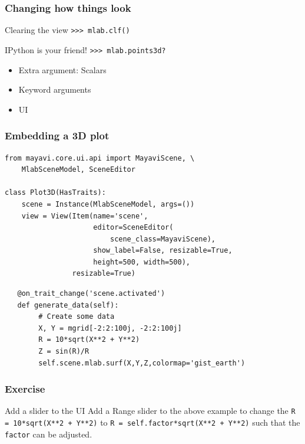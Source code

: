 \documentclass[14pt,compress]{beamer}
\newcommand{\typ}[1]{\lstinline{#1}}
\newcommand{\PythonCode}[1]{\lstinline{#1}}
\begin{document}
\begin{frame}
    \frametitle{Changing how things look}

    \begin{block}{Clearing the view}
    \typ{>>> mlab.clf()}
    \end{block}

    \pause

    \begin{block}{IPython is your friend!}
    \PythonCode{>>> mlab.points3d?}

    \begin{itemize}

        \item Extra argument: Scalars

        \item Keyword arguments

        \item UI
    \end{itemize}
    \end{block}
\end{frame}

\begin{frame}
\frametitle{Embedding a 3D plot}
\footnotesize
\begin{lstlisting}
from mayavi.core.ui.api import MayaviScene, \
    MlabSceneModel, SceneEditor

class Plot3D(HasTraits):
    scene = Instance(MlabSceneModel, args=())
    view = View(Item(name='scene',
                     editor=SceneEditor(
                         scene_class=MayaviScene),
                     show_label=False, resizable=True,
                     height=500, width=500),
                resizable=True)
\end{lstlisting}
\pause
\begin{lstlisting}
   @on_trait_change('scene.activated')
   def generate_data(self):
        # Create some data
        X, Y = mgrid[-2:2:100j, -2:2:100j]
        R = 10*sqrt(X**2 + Y**2)
        Z = sin(R)/R
        self.scene.mlab.surf(X,Y,Z,colormap='gist_earth')
\end{lstlisting}
\end{frame}

\begin{frame}[plain]
    \frametitle{Exercise}
\normalsize
  \begin{block}{Add a slider to the UI}
      Add a Range slider to the above example to change the
       \typ{R = 10*sqrt(X**2 + Y**2)} to 
       \typ{R = self.factor*sqrt(X**2 + Y**2)}
       such that the \typ{factor} can be adjusted.
  \end{block}
\end{frame}
\end{document}

